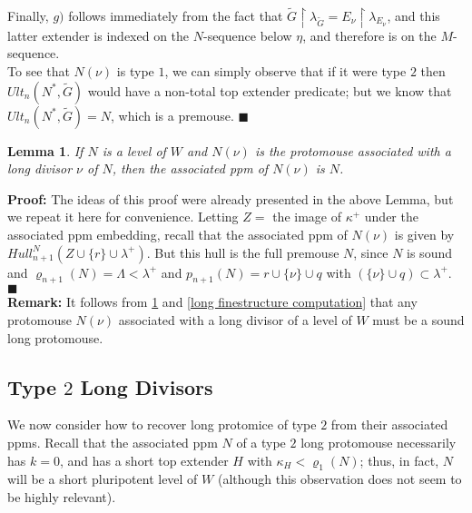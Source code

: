 \documentclass[12pt]{article}
\newtheorem{lem}[thm]{Lemma}
\begin{document}
Finally, $g)$ follows immediately from the fact that $\tilde{G} \restriction \lambda_{\tilde{G}} = E_{\nu} \restriction \lambda_{E_\nu}$, and this latter extender is indexed on the $N$-sequence below $\eta$, and therefore is on the $M$-sequence.\\

To see that $N (\nu )$ is type $1$, we can simply observe that if it were type $2$ then $Ult_n ( N^* , \tilde{G} )$ would have a non-total top extender predicate; but we know that $Ult_n ( N^* , \tilde{G} ) = N$, which is a premouse.  $\blacksquare$\\




\begin{lem} \label{long associated associated is original}
If $N$ is a level of $W$ and $N (\nu)$ is the protomouse associated with a long divisor $\nu$ of $N$, then the associated ppm of $N (\nu)$ is $N$.
\end{lem}

\textbf{Proof:}  The ideas of this proof were already presented in the above Lemma, but we repeat it here for convenience.  Letting $Z = $ the image of $\kappa^+$ under the associated ppm embedding, recall that the associated ppm of $N(\nu)$ is given by $Hull_{n+1}^N ( Z \cup \{ r \} \cup \lambda^+)$.  But this hull is the full premouse $N$, since $N$ is sound and $\varrho_{n+1} (N) = \Lambda < \lambda^+$ and $p _{n+1}(N) = r \cup \{ \nu \} \cup q$ with $( \{ \nu \} \cup q ) \subset \lambda^+$. $\blacksquare$\\

\textbf{Remark:}  It follows from \ref{long associated associated is original} and \ref{long finestructure computation} that any protomouse $N(\nu)$ associated with a long divisor of a level of $W$ must be a sound long protomouse.\\











\subsection{Type $2$ Long Divisors}










We now consider how to recover long protomice of type $2$ from their associated ppms.  Recall that the associated ppm $N$ of a type $2$ long protomouse necessarily has $k = 0$, and has a short top extender $H$ with $\kappa_H < \varrho_1 ( N)$; thus, in fact, $N$ will be a short pluripotent level of $W$ (although this observation does not seem to be highly relevant).\\
\end{document}
